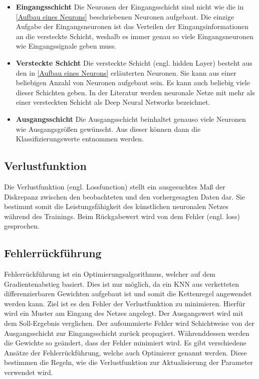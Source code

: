 \begin{itemize}
\item \textbf{Eingangsschicht} Die Neuronen der Eingangsschicht sind nicht wie die in \ref{Aufbau eines Neurons} beschriebenen Neuronen aufgebaut. Die einzige Aufgabe der Eingangsneuronen ist das Verteilen der Eingangsinformationen an die versteckte Schicht, weshalb es immer genau so viele Eingangsneuronen wie Eingangssignale geben muss.

\item \textbf{Versteckte Schicht}
Die versteckte Schicht (engl. hidden Layer) besteht aus den in \ref{Aufbau eines Neurons} erläuterten Neuronen. Sie kann aus einer beliebigen Anzahl von Neuronen aufgebaut sein. Es kann auch beliebig viele dieser Schichten geben. In der Literatur werden  neuronale Netze mit mehr als einer versteckten Schicht als Deep Neural Networks bezeichnet.

\item \textbf{Ausgangsschicht}
Die Ausgangsschicht beinhaltet genauso viele Neuronen wie Ausgangsgrößen gewünscht. Aus dieser können dann die Klassifizierungswerte entnommen werden.
\end{itemize}

\subsection{Verlustfunktion}
Die Verlustfunktion (engl. Lossfunction) stellt ein ausgesuchtes Maß der Diskrepanz zwischen den beobachteten und den vorhergesagten Daten dar. Sie bestimmt somit die Leistungsfähigkeit des künstlichen neuronalen Netzes während des Trainings. Beim Rückgabewert wird von dem Fehler (engl. loss) gesprochen.

\subsection{Fehlerrückführung}
Fehlerrückführung ist ein Optimierungsalgorithmus, welcher auf dem Gradientenabstieg basiert. Dies ist nur möglich, da ein KNN aus verketteten differenzierbaren Gewichten aufgebaut ist und somit die Kettenregel angewendet werden kann. Ziel ist es den Fehler der Verlustfunktion zu minimieren. Hierfür wird ein Muster am Eingang des Netzes angelegt. Der Ausgangswert wird mit dem Soll-Ergebnis verglichen. Der aufsummierte Fehler wird Schichtweise von der Ausgangsschicht zur Eingangsschicht zurück propagiert. Währenddessen werden die Gewichte so geändert, dass der Fehler minimiert wird. Es gibt verschiedene Ansätze der Fehlerrückführung, welche auch Optimierer genannt werden. Diese bestimmen die Regeln, wie die Verlustfunktion zur Aktualisierung der Parameter verwendet wird. \cite[p.~83]{Chollet2018}



